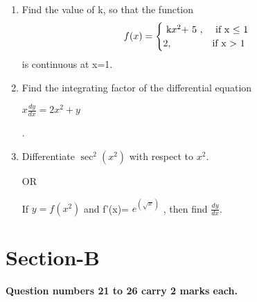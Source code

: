 \documentclass[journal,12pt,twocolumn]{IEEEtran}
\renewcommand\thesection{\arabic{section}}
\begin{document}
\begin{enumerate}[label=\thesection.\arabic*.,ref=\thesection.\theenumi]
\item  Find the value of k, so that the function \begin{equation*}  f(x)  = \begin{cases}
                $ k$ x^2 $+ 5 $ ,  &\text{ if  x $\leq$ 1 } \\
        2 , &\text{if x $ > $ 1}
\end{cases} \end{equation*}  is continuous at x=1. \\
\item  Find the integrating factor of the differential equation \begin{center} $ x\frac{dy}{dx} = 2x^2 +y $ \end{center} .
\item  Differentiate $ \sec^2(x^2) $ with respect to $ x^2 $.
    \begin{center}
        OR
    \end{center}
 If $y=f(x^2)$  and  f'(x)= $ e^{\left(\sqrt{x}\right)}$  , then find $\frac{dy}{dx}$.\\

\end{enumerate}
\section{Section-B}

\textbf{Question numbers 21 to 26 carry 2 marks each.}\\
\end{document}
